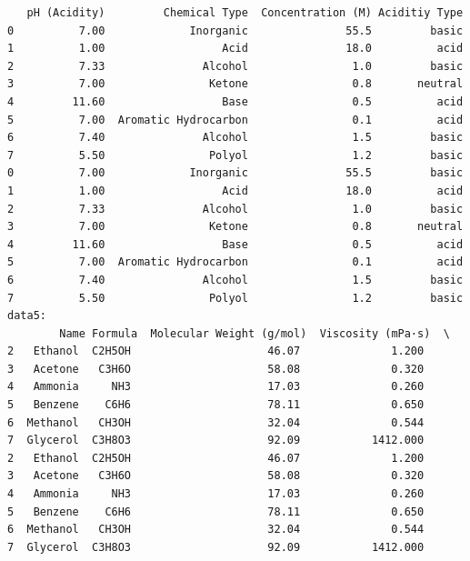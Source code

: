 \documentclass[
  letterpaper,
  DIV=11,
  numbers=noendperiod]{scrreprt}
\begin{document}
\begin{verbatim}
   pH (Acidity)         Chemical Type  Concentration (M) Aciditiy Type  
0          7.00             Inorganic               55.5         basic  
1          1.00                  Acid               18.0          acid  
2          7.33               Alcohol                1.0         basic  
3          7.00                Ketone                0.8       neutral  
4         11.60                  Base                0.5          acid  
5          7.00  Aromatic Hydrocarbon                0.1          acid  
6          7.40               Alcohol                1.5         basic  
7          5.50                Polyol                1.2         basic  
0          7.00             Inorganic               55.5         basic  
1          1.00                  Acid               18.0          acid  
2          7.33               Alcohol                1.0         basic  
3          7.00                Ketone                0.8       neutral  
4         11.60                  Base                0.5          acid  
5          7.00  Aromatic Hydrocarbon                0.1          acid  
6          7.40               Alcohol                1.5         basic  
7          5.50                Polyol                1.2         basic  
data5: 
        Name Formula  Molecular Weight (g/mol)  Viscosity (mPa·s)  \
2   Ethanol  C2H5OH                     46.07              1.200   
3   Acetone   C3H6O                     58.08              0.320   
4   Ammonia     NH3                     17.03              0.260   
5   Benzene    C6H6                     78.11              0.650   
6  Methanol   CH3OH                     32.04              0.544   
7  Glycerol  C3H8O3                     92.09           1412.000   
2   Ethanol  C2H5OH                     46.07              1.200   
3   Acetone   C3H6O                     58.08              0.320   
4   Ammonia     NH3                     17.03              0.260   
5   Benzene    C6H6                     78.11              0.650   
6  Methanol   CH3OH                     32.04              0.544   
7  Glycerol  C3H8O3                     92.09           1412.000   


\end{verbatim}
\end{document}
